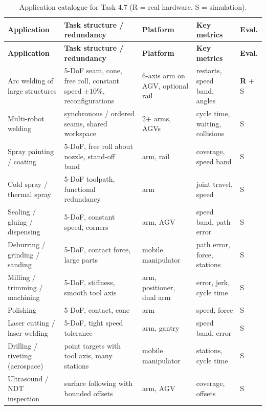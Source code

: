 \documentclass[10pt,a4paper]{article}
\begin{document}
\begin{longtable}{@{}L{2.9cm}L{4.6cm}L{3.1cm}L{2.3cm}L{1.3cm}@{}}
\caption{Application catalogue for Task 4.7 (R = real hardware, S = simulation).}\label{tab:apps}\\
\toprule
\textbf{Application} & \textbf{Task structure / redundancy} & \textbf{Platform} & \textbf{Key metrics} & \textbf{Eval.} \\
\midrule\endfirsthead
\toprule
\textbf{Application} & \textbf{Task structure / redundancy} & \textbf{Platform} & \textbf{Key metrics} & \textbf{Eval.} \\
\midrule\endhead
Arc welding of large structures & 5-DoF seam, cone, free roll, constant speed $\pm10\%$, reconfigurations & 6-axis arm on AGV, optional rail & restarts, speed band, angles & \textbf{R} + S \\
Multi-robot welding & synchronous / ordered seams, shared workspace~\cite{tang2023dualrobotweld} & 2+ arms, AGVs & cycle time, waiting, collisions & S \\
Spray painting / coating & 5-DoF, free roll about nozzle, stand-off band~\cite{weingartshofer2023pathframework} & arm, rail & coverage, speed band & S \\
Cold spray / thermal spray & 5-DoF toolpath, functional redundancy~\cite{razjigaev2025functional} & arm & joint travel, speed & S \\
Sealing / gluing / dispensing & 5-DoF, constant speed, corners & arm, AGV & speed band, path error & S \\
Deburring / grinding / sanding & 5-DoF, contact force, large parts~\cite{zhao2021mobilemachining} & mobile manipulator & path error, force, stations & S \\
Milling / trimming / machining & 5-DoF, stiffness, smooth tool axis~\cite{yang2024toolpathsmoothing,lu2022toolorientation} & arm, positioner, dual arm~\cite{ye2026nullspacemultirobot} & error, jerk, cycle time & S \\
Polishing & 5-DoF, contact, cone & arm & speed, force & S \\
Laser cutting / laser welding & 5-DoF, tight speed tolerance & arm, gantry & speed band, error & S \\
Drilling / riveting (aerospace) & point targets with tool axis, many stations~\cite{nguyen2023taskclustering} & mobile manipulator & stations, cycle time & S \\
Ultrasound / NDT inspection & surface following with bounded offsets~\cite{yin2024dprealtime} & arm, AGV & coverage, offsets & S \\

\end{longtable}
\end{document}
